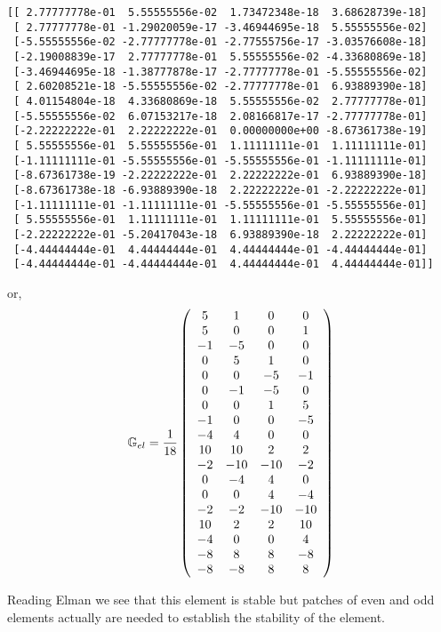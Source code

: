 \begin{verbatim}
[[ 2.77777778e-01  5.55555556e-02  1.73472348e-18  3.68628739e-18]
 [ 2.77777778e-01 -1.29020059e-17 -3.46944695e-18  5.55555556e-02]
 [-5.55555556e-02 -2.77777778e-01 -2.77555756e-17 -3.03576608e-18]
 [-2.19008839e-17  2.77777778e-01  5.55555556e-02 -4.33680869e-18]
 [-3.46944695e-18 -1.38777878e-17 -2.77777778e-01 -5.55555556e-02]
 [ 2.60208521e-18 -5.55555556e-02 -2.77777778e-01  6.93889390e-18]
 [ 4.01154804e-18  4.33680869e-18  5.55555556e-02  2.77777778e-01]
 [-5.55555556e-02  6.07153217e-18  2.08166817e-17 -2.77777778e-01]
 [-2.22222222e-01  2.22222222e-01  0.00000000e+00 -8.67361738e-19]
 [ 5.55555556e-01  5.55555556e-01  1.11111111e-01  1.11111111e-01]
 [-1.11111111e-01 -5.55555556e-01 -5.55555556e-01 -1.11111111e-01]
 [-8.67361738e-19 -2.22222222e-01  2.22222222e-01  6.93889390e-18]
 [-8.67361738e-18 -6.93889390e-18  2.22222222e-01 -2.22222222e-01]
 [-1.11111111e-01 -1.11111111e-01 -5.55555556e-01 -5.55555556e-01]
 [ 5.55555556e-01  1.11111111e-01  1.11111111e-01  5.55555556e-01]
 [-2.22222222e-01 -5.20417043e-18  6.93889390e-18  2.22222222e-01]
 [-4.44444444e-01  4.44444444e-01  4.44444444e-01 -4.44444444e-01]
 [-4.44444444e-01 -4.44444444e-01  4.44444444e-01  4.44444444e-01]]
\end{verbatim}


or,
\[
{\mathbb{G}}_{el} 
=\frac{1}{18}
\left(
\begin{array}{cccc}
5 &1 &0 &0 \\
5 &0 &0 &1 \\
-1 &-5 &0 &0\\ 
0 &5 &1 &0\\
0 &0 &-5 &-1 \\
0 &-1 &-5 &0 \\
0 &0& 1& 5\\
-1 &0 &0& -5\\
-4 &4 &0 &0\\
10 &10& 2 &2\\
-2 &-10 &-10 &-2\\
0 &-4 &4& 0\\
0 &0 &4 &-4\\
-2 &-2& -10 &-10\\
10 &2 &2 &10\\
-4 &0 &0 &4\\
-8 &8 &8 &-8 \\
-8 &-8 &8 &8
\end{array}
\right)
\]

Reading Elman \cite{elsw} we see that this element is stable but patches of 
even and odd elements actually are needed to establish the stability of the element. 










